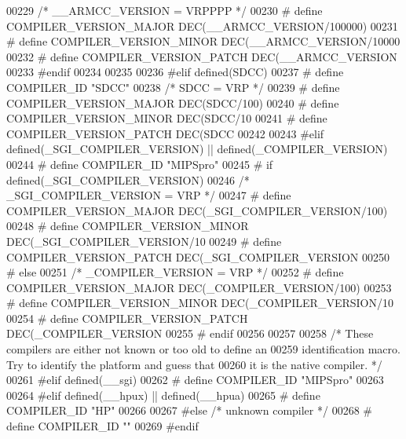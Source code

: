 \begin{DoxyCode}
{{{{{{{{{{{{{{{{{{{{{{{{{{{{00229   \textcolor{comment}{/* \_\_ARMCC\_VERSION = VRPPPP */}
00230 \textcolor{preprocessor}{  # define COMPILER\_VERSION\_MAJOR DEC(\_\_ARMCC\_VERSION/100000)}
00231 \textcolor{preprocessor}{  # define COMPILER\_VERSION\_MINOR DEC(\_\_ARMCC\_VERSION/10000 %
00232 \textcolor{preprocessor}{  # define COMPILER\_VERSION\_PATCH DEC(\_\_ARMCC\_VERSION    %
00233 \textcolor{preprocessor}{#endif}
00234 
00235 
00236 \textcolor{preprocessor}{#elif defined(SDCC)}
00237 \textcolor{preprocessor}{# define COMPILER\_ID "SDCC"}
00238   \textcolor{comment}{/* SDCC = VRP */}
00239 \textcolor{preprocessor}{#  define COMPILER\_VERSION\_MAJOR DEC(SDCC/100)}
00240 \textcolor{preprocessor}{#  define COMPILER\_VERSION\_MINOR DEC(SDCC/10 %
00241 \textcolor{preprocessor}{#  define COMPILER\_VERSION\_PATCH DEC(SDCC    %
00242 
00243 \textcolor{preprocessor}{#elif defined(\_SGI\_COMPILER\_VERSION) || defined(\_COMPILER\_VERSION)}
00244 \textcolor{preprocessor}{# define COMPILER\_ID "MIPSpro"}
00245 \textcolor{preprocessor}{# if defined(\_SGI\_COMPILER\_VERSION)}
00246   \textcolor{comment}{/* \_SGI\_COMPILER\_VERSION = VRP */}
00247 \textcolor{preprocessor}{#  define COMPILER\_VERSION\_MAJOR DEC(\_SGI\_COMPILER\_VERSION/100)}
00248 \textcolor{preprocessor}{#  define COMPILER\_VERSION\_MINOR DEC(\_SGI\_COMPILER\_VERSION/10 %
00249 \textcolor{preprocessor}{#  define COMPILER\_VERSION\_PATCH DEC(\_SGI\_COMPILER\_VERSION    %
00250 \textcolor{preprocessor}{# else}
00251   \textcolor{comment}{/* \_COMPILER\_VERSION = VRP */}
00252 \textcolor{preprocessor}{#  define COMPILER\_VERSION\_MAJOR DEC(\_COMPILER\_VERSION/100)}
00253 \textcolor{preprocessor}{#  define COMPILER\_VERSION\_MINOR DEC(\_COMPILER\_VERSION/10 %
00254 \textcolor{preprocessor}{#  define COMPILER\_VERSION\_PATCH DEC(\_COMPILER\_VERSION    %
00255 \textcolor{preprocessor}{# endif}
00256 
00257 
00258 \textcolor{comment}{/* These compilers are either not known or too old to define an}
00259 \textcolor{comment}{  identification macro.  Try to identify the platform and guess that}
00260 \textcolor{comment}{  it is the native compiler.  */}
00261 \textcolor{preprocessor}{#elif defined(\_\_sgi)}
00262 \textcolor{preprocessor}{# define COMPILER\_ID "MIPSpro"}
00263 
00264 \textcolor{preprocessor}{#elif defined(\_\_hpux) || defined(\_\_hpua)}
00265 \textcolor{preprocessor}{# define COMPILER\_ID "HP"}
00266 
00267 \textcolor{preprocessor}{#else }\textcolor{comment}{/* unknown compiler */}\textcolor{preprocessor}{}
00268 \textcolor{preprocessor}{# define COMPILER\_ID ""}
00269 \textcolor{preprocessor}{#endif}
}}}}}}}}}}}}}}}}}}}}}}}}}}}}}}}}}}}}
\end{DoxyCode}

